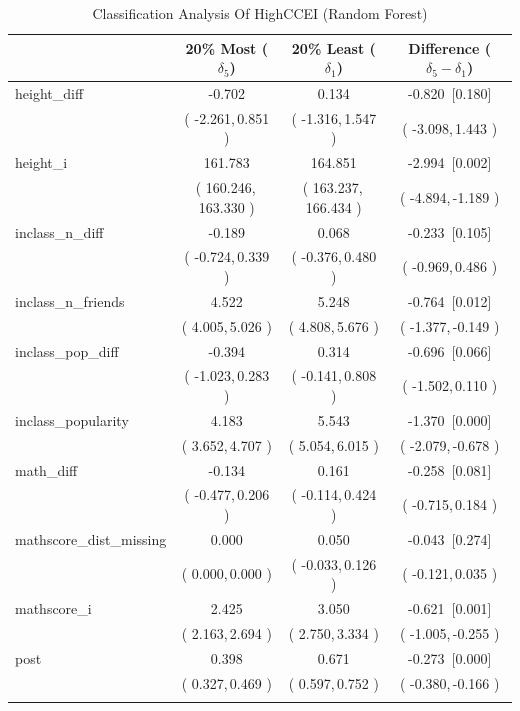 \documentclass[11 pt]{article}
\begin{document}
\begin{table}[H]
\centering
\footnotesize
\begin{threeparttable}
\caption{Classification Analysis Of HighCCEI (Random Forest)}\label{tab:clan_clb_rf}
\begin{tabular}{lccc}
\toprule \hline
 & 20\% Most ($\delta_5$) & 20\% Least ($\delta_1$) & Difference ($\delta_5-\delta_1$) \\
\midrule
height\_diff & -0.702 & 0.134 & -0.820 \,[0.180] \\
& ( -2.261,\,0.851 ) & ( -1.316,\,1.547 ) & ( -3.098,\,1.443 ) \\
\addlinespace
height\_i & 161.783 & 164.851 & -2.994 \,[0.002] \\
& ( 160.246,\,163.330 ) & ( 163.237,\,166.434 ) & ( -4.894,\,-1.189 ) \\
\addlinespace
inclass\_n\_diff & -0.189 & 0.068 & -0.233 \,[0.105] \\
& ( -0.724,\,0.339 ) & ( -0.376,\,0.480 ) & ( -0.969,\,0.486 ) \\
\addlinespace
inclass\_n\_friends & 4.522 & 5.248 & -0.764 \,[0.012] \\
& ( 4.005,\,5.026 ) & ( 4.808,\,5.676 ) & ( -1.377,\,-0.149 ) \\
\addlinespace
inclass\_pop\_diff & -0.394 & 0.314 & -0.696 \,[0.066] \\
& ( -1.023,\,0.283 ) & ( -0.141,\,0.808 ) & ( -1.502,\,0.110 ) \\
\addlinespace
inclass\_popularity & 4.183 & 5.543 & -1.370 \,[0.000] \\
& ( 3.652,\,4.707 ) & ( 5.054,\,6.015 ) & ( -2.079,\,-0.678 ) \\
\addlinespace
math\_diff & -0.134 & 0.161 & -0.258 \,[0.081] \\
& ( -0.477,\,0.206 ) & ( -0.114,\,0.424 ) & ( -0.715,\,0.184 ) \\
\addlinespace
mathscore\_dist\_missing & 0.000 & 0.050 & -0.043 \,[0.274] \\
& ( 0.000,\,0.000 ) & ( -0.033,\,0.126 ) & ( -0.121,\,0.035 ) \\
\addlinespace
mathscore\_i & 2.425 & 3.050 & -0.621 \,[0.001] \\
& ( 2.163,\,2.694 ) & ( 2.750,\,3.334 ) & ( -1.005,\,-0.255 ) \\
\addlinespace
post & 0.398 & 0.671 & -0.273 \,[0.000] \\
& ( 0.327,\,0.469 ) & ( 0.597,\,0.752 ) & ( -0.380,\,-0.166 ) \\
\addlinespace 
\hline \bottomrule

\end{tabular}
\end{threeparttable}
\end{table}
\end{document}
